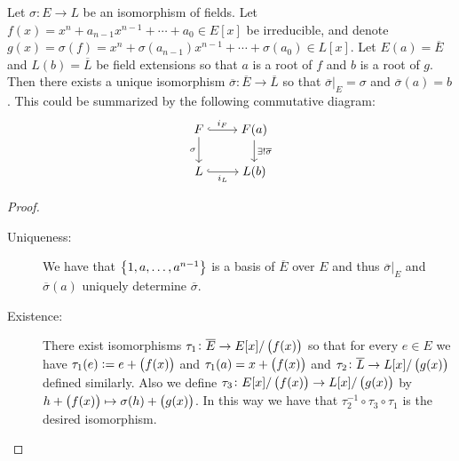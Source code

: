 \documentclass[11pt,a4paper]{article}
\begin{document}
\begin{lemma}
  \label{lem:simple-extension-isomorphism}
  Let $\sigma \colon E \to L$ be an isomorphism of fields.
  Let $f(x) = x^n + a_{n-1} x^{n-1} + \cdots + a_0 \in E[x]$ be irreducible,
  and denote
  $g(x) = \sigma(f) =  
    x^n + \sigma(a_{n-1}) x^{n-1} + \cdots + \sigma(a_0) \in L[x]$.
  Let $E(a) = \overline E$ and $L(b) = \overline L$ be field extensions
  so that $a$ is a root of $f$ and $b$ is a root of $g$.
  Then there exists a unique isomorphism
  $\overline \sigma \colon \overline E \to \overline L$ so that
  $\overline \sigma\vert_{E} = \sigma$ and $\overline \sigma(a) = b$.
  This could be summarized by the following commutative diagram:
  \[\begin{tikzcd}[ampersand replacement=\&,cramped]
    F \& {F(a)} \\
    L \& {L(b)}
    \arrow["{i_F}",hook, from=1-1, to=1-2]
    \arrow["\sigma"', from=1-1, to=2-1]
    \arrow["{\exists !\overline \sigma}", from=1-2, to=2-2]
    \arrow["{i_L}"',hook, from=2-1, to=2-2]
  \end{tikzcd}\]
\end{lemma}
\begin{proof} \phantom{}
  \begin{description}
    \item[Uniqueness:]
  We have that $\left\{1,a,\dots,a^{n-1}\right\}$ is a basis of $\overline E$
  over $E$ and thus $\overline \sigma\vert_E$ and $\overline \sigma(a)$
  uniquely determine $\overline \sigma$.
    \item[Existence:]
      There exist isomorphisms
      $\tau_1 \colon \overline E \to E[x]/\del{f(x)}$
      so that for every $e \in E$ we have $\tau_1(e) := e + \del{f(x)}$
      and $\tau_1(a) = x + \del{f(x)}$
      and $\tau_2 \colon \overline L \to L[x]/\del{g(x)}$ defined similarly.
      Also we define $\tau_3 \colon E[x]/\del{f(x)} \to L[x]/\del{g(x)}$
      by $h + \del{f(x)} \mapsto \sigma(h) + \del{g(x)}$.
      In this way we have that $\tau_2^{-1} \circ \tau_3 \circ \tau_1$
      is the desired isomorphism.
  \end{description}
\end{proof}
\end{document}
